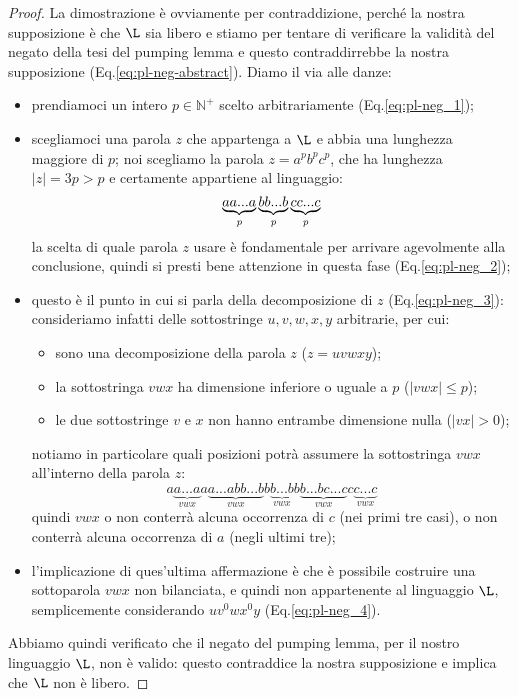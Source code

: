 \documentclass[class=book, crop=false, oneside, 12pt]{standalone}
\begin{document}
  \begin{proof}
    La dimostrazione è ovviamente per contraddizione, perché la nostra supposizione è che \(\L\) sia libero e stiamo per tentare di verificare la validità del negato della tesi del pumping lemma e questo contraddirrebbe la nostra supposizione (Eq.\ref{eq:pl-neg-abstract}). Diamo il via alle danze:
    \begin{itemize}
      \item prendiamoci un intero \(p \in \mathbb{N}^+\) scelto arbitrariamente (Eq.\ref{eq:pl-neg_1});
      \item scegliamoci una parola \(z\) che appartenga a \(\L\) e abbia una lunghezza maggiore di \(p\); noi scegliamo la parola \(z = a^pb^pc^p\), che ha lunghezza \(|z| = 3p > p\) e certamente appartiene al linguaggio:
      \begin{equation*}
        \underbrace{aa...a}_\text{\emph{p}}\underbrace{bb...b}_\text{\emph{p}}\underbrace{cc...c}_\text{\emph{p}}
      \end{equation*}
      la scelta di quale parola \(z\) usare è fondamentale per arrivare agevolmente alla conclusione, quindi si presti bene attenzione in questa fase (Eq.\ref{eq:pl-neg_2});
      \item questo è il punto in cui si parla della decomposizione di \(z\) (Eq.\ref{eq:pl-neg_3}): consideriamo infatti delle sottostringe \(u, v, w, x, y\) arbitrarie, per cui:
      \begin{itemize}
        \item sono una decomposizione della parola \(z\) (\(z = uvwxy\));
        \item la sottostringa \(vwx\) ha dimensione inferiore o uguale a \(p\) (\(|vwx| \le p\));
        \item le due sottostringe \(v\) e \(x\) non hanno entrambe dimensione nulla (\(|vx| > 0\));
      \end{itemize}
      notiamo in particolare quali posizioni potrà assumere la sottostringa \(vwx\) all'interno della parola \(z\):
      \begin{equation*}
        a\underbrace{a...a}_{vwx}
        a\underbrace{a...abb...b}_{vwx}
        b\underbrace{b...b}_{vwx}
        b\underbrace{b...bc...c}_{vwx}
        c\underbrace{c...c}_{vwx}
      \end{equation*}
      quindi \(vwx\) o non conterrà alcuna occorrenza di \(c\) (nei primi tre casi), o non conterrà alcuna occorrenza di \(a\) (negli ultimi tre);
      \item l'implicazione di ques'ultima affermazione è che è possibile costruire una sottoparola \(vwx\) non bilanciata, e quindi non appartenente al linguaggio \(\L\), semplicemente considerando \(uv^0wx^0y\) (Eq.\ref{eq:pl-neg_4}).
    \end{itemize}
    Abbiamo quindi verificato che il negato del pumping lemma, per il nostro linguaggio \(\L\), non è valido: questo contraddice la nostra supposizione e implica che \(\L\) non è libero.
  \end{proof}
\end{document}
